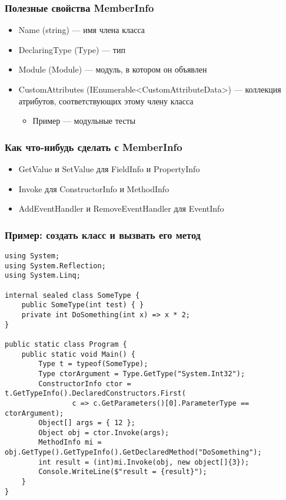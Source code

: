 \documentclass[xetex,mathserif,serif]{beamer}
\begin{document}
	\begin{frame}
		\frametitle{Полезные свойства MemberInfo}
		\begin{itemize}
			\item Name (string) --- имя члена класса
			\item DeclaringType (Type) --- тип
			\item Module (Module) --- модуль, в котором он объявлен
			\item CustomAttributes (IEnumerable<CustomAttributeData>) --- коллекция атрибутов, соответствующих этому члену класса
			\begin{itemize}
				\item Пример --- модульные тесты
			\end{itemize}
		\end{itemize}
	\end{frame}

	\begin{frame}
		\frametitle{Как что-нибудь сделать с MemberInfo}
		\begin{itemize}
			\item GetValue и SetValue для FieldInfo и PropertyInfo
			\item Invoke для ConstructorInfo и MethodInfo
			\item AddEventHandler и RemoveEventHandler для EventInfo
		\end{itemize}
	\end{frame}

	\begin{frame}[fragile]
		\frametitle{Пример: создать класс и вызвать его метод}
		\begin{scriptsize}
			\begin{verbatim}
using System;
using System.Reflection;
using System.Linq;

internal sealed class SomeType {
    public SomeType(int test) { }
    private int DoSomething(int x) => x * 2;
}

public static class Program {
    public static void Main() {
        Type t = typeof(SomeType);
        Type ctorArgument = Type.GetType("System.Int32");
        ConstructorInfo ctor = t.GetTypeInfo().DeclaredConstructors.First(
                c => c.GetParameters()[0].ParameterType == ctorArgument);
        Object[] args = { 12 };
        Object obj = ctor.Invoke(args);
        MethodInfo mi = obj.GetType().GetTypeInfo().GetDeclaredMethod("DoSomething");
        int result = (int)mi.Invoke(obj, new object[]{3});
        Console.WriteLine($"result = {result}");
    }
}
			\end{verbatim}
		\end{scriptsize}
	\end{frame}
\end{document}
